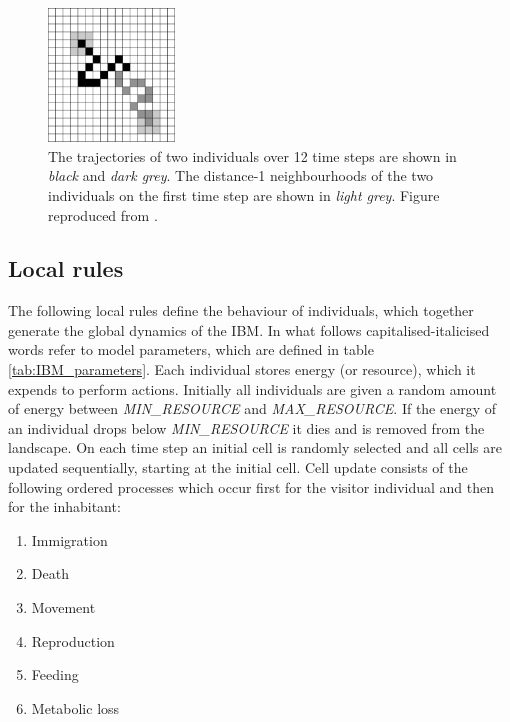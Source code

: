 

\begin{figure}
	\centering
	\includegraphics[width=0.3\textwidth]{"diagrams/IBM_movement"}
	\caption{The trajectories of two individuals over 12 time steps are shown in \emph{black} and \emph{dark grey}. The distance-1 neighbourhoods of the two individuals on the first time step are shown in \emph{light grey}. Figure reproduced from \cite{lurgi2015effects}.}
	\label{fig:IBM_motion}
\end{figure}


\subsection{Local rules}
\label{sec:CA_rules}

The following local rules define the behaviour of individuals, which together generate the global dynamics of the IBM. In what follows capitalised-italicised words refer to model parameters, which are defined in table \ref{tab:IBM_parameters}. Each individual stores energy (or resource), which it expends to perform actions. Initially all individuals are given a random amount of energy between \emph{MIN\_RESOURCE} and \emph{MAX\_RESOURCE}. If the energy of an individual drops below \emph{MIN\_RESOURCE} it dies and is removed from the landscape. On each time step an initial cell is randomly selected and all cells are updated sequentially, starting at the initial cell. Cell update consists of the following ordered processes which occur first for the visitor individual and then for the inhabitant:

\begin{enumerate}
	\item Immigration
	\item Death
	\item Movement
	\item Reproduction
	\item Feeding
	\item Metabolic loss
\end{enumerate}

